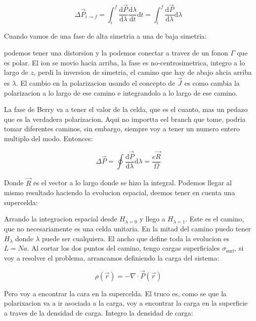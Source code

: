 \documentclass[11pt,fleqn]{book}
\begin{document}
\begin{equation}
    \Delta\vec{P}_{i\rightarrow f}=\int_{i}^{f}\frac{\mathrm{d}\vec{P}}{\mathrm{d}\lambda}\frac{\mathrm{d}\lambda}{\mathrm{d}t}\mathrm{d}t=\int_{i}^{f}\frac{\mathrm{d}\vec{P}}{\mathrm{d}\lambda}\mathrm{d}\lambda
\end{equation}

Cuando vamos de una fase de alta simetria a una de baja simetria:


podemos tener una distorsion y la podemos conectar a travez de un fonon $\Gamma$ que es polar. El ion se movio hacia arriba, la fase es no-centrosimetrica, integro a lo largo de $z$, perdi la inversion de simetria, el camino que hay de abajo ahcia arriba es $\lambda$. El cambio en la polarizacion usando el concepto de $\vec{J}$ es como cambia la polarizacion a lo largo de ese camino  e integrandolo a lo largo de ese camino.

La fase de Berry va a tener el valor de la celda, que es el cuanto, mas un pedazo que es la verdadera polarizacion. Aqui no importta eel branch que tome, podria tomar diferentes caminos, sin embargo, siempre voy a tener un numero entero multiplo del modo. Entonces:

\begin{equation}
    \Delta\vec{P}=\oint\frac{\mathrm{d}\vec{P}}{\mathrm{d}\lambda}\mathrm{d}\lambda=\frac{e\vec{R}}{\Omega}
\end{equation}

Donde $\vec{R}$ es el vector a lo largo donde se hizo la integral. Podemos llegar al mismo resultado haciendo la evolucion espacial, deemos tener en cuenta una supercelda:


Arrando la integracion espacial desde $H_{\lambda=0}$ y llego a $H_{\lambda=1}$. Este es el camino, que no necesariamente es una celda unitaria. En la mitad del camino puedo tener $H_{\lambda}$ donde $\lambda$ puede ser cualquiera. El ancho que define toda la evolucion es $L=Na$. Al cortar los dos puntos del camino, tengo cargas superficiales $\sigma_{\text{surf}}$, si voy a resolver el problema, arrancamos definiendo la carga del sistema:

\begin{equation}
    \rho(\vec{r})=-\nabla\cdot\vec{P}(\vec{r})
\end{equation}

Pero voy a encontrar la cara en la supercelda. El truco es, como se que la polarixacion va a ir asociada a la carga, voy a encontrar  la carga en la superficie a traves de la densidad de carga. Integro la densidad de carga:
\end{document}
